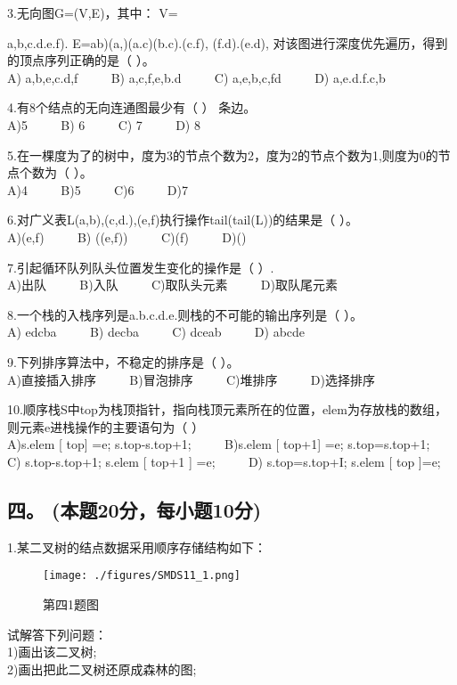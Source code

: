 3.无向图G=(V,E)，其中： V={a,b,c.d.e.f). E={ab)(a,)(a.c)(b.c).(c.f), (f.d).(e.d)}, 对该图进行深度优先遍历，得到的顶点序列正确的是（ ）。 \\
A) a,b,e,c.d,f $\qquad$ B) a,c,f,e,b.d $\qquad$ C) a,e,b,c,fd $\qquad$ D) a,e.d.f.c,b

4.有8个结点的无向连通图最少有（ ） 条边。 \\
A)5 $\qquad$ B) 6 $\qquad$ C) 7 $\qquad$ D) 8

5.在一棵度为了的树中，度为3的节点个数为2，度为2的节点个数为1,则度为0的节点个数为（  ）。 \\
A)4 $\qquad$ B)5 $\qquad$ C)6 $\qquad$ D)7

6.对广义表L(a,b),(c,d.),(e,f)执行操作tail(tail(L))的结果是（  ）。 \\
A)(e,f) $\qquad$ B) ((e,f)) $\qquad$ C)(f) $\qquad$ D)()

7.引起循环队列队头位置发生变化的操作是（ ）. \\
A)出队 $\qquad$ B)入队 $\qquad$ C)取队头元素 $\qquad$ D)取队尾元素

8.一个栈的入栈序列是a.b.c.d.e.则栈的不可能的输出序列是（ ）。 \\
A) edcba $\qquad$ B) decba $\qquad$ C) dceab $\qquad$ D) abcde

9.下列排序算法中，不稳定的排序是（  ）。 \\
A)直接插入排序 $\qquad$ B)冒泡排序 $\qquad$ C)堆排序 $\qquad$ D)选择排序

10.顺序栈S中top为栈顶指针，指向栈顶元素所在的位置，elem为存放栈的数组，则元素e进栈操作的主要语句为（  ） \\
A)s.elem [ top] =e; s.top-s.top+1; $\qquad$ B)s.elem [ top+1] =e; s.top=s.top+1; \\
C) s.top-s.top+1; s.elem [ top+1 ] =e; $\qquad$ D) s.top=s.top+I; s.elem [ top ]=e;

\subsection{四。 (本题20分，每小题10分)}
1.某二叉树的结点数据采用顺序存储结构如下： \\
\begin{figure}[ht]
\centering
\texttt{[image: ./figures/SMDS11\_1.png]}
\caption{第四1题图} \label{SMDS11_fig1}
\end{figure}
试解答下列问题： \\
1)画出该二叉树; \\
2)画出把此二叉树还原成森林的图;

}
